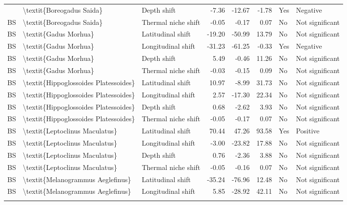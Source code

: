 \begin{longtable}[t]{lllrrrll}
{{\addlinespace
BS & \textbackslash{}textit\{Boreogadus Saida\} & Depth shift & -7.36 & -12.67 & -1.78 & Yes & Negative\\
BS & \textbackslash{}textit\{Boreogadus Saida\} & Thermal niche shift & -0.05 & -0.17 & 0.07 & No & Not significant\\
BS & \textbackslash{}textit\{Gadus Morhua\} & Latitudinal shift & -19.20 & -50.99 & 13.79 & No & Not significant\\
BS & \textbackslash{}textit\{Gadus Morhua\} & Longitudinal shift & -31.23 & -61.25 & -0.33 & Yes & Negative\\
BS & \textbackslash{}textit\{Gadus Morhua\} & Depth shift & 5.49 & -0.46 & 11.26 & No & Not significant\\
\addlinespace
BS & \textbackslash{}textit\{Gadus Morhua\} & Thermal niche shift & -0.03 & -0.15 & 0.09 & No & Not significant\\
BS & \textbackslash{}textit\{Hippoglossoides Platessoides\} & Latitudinal shift & 10.97 & -8.99 & 31.73 & No & Not significant\\
BS & \textbackslash{}textit\{Hippoglossoides Platessoides\} & Longitudinal shift & 2.57 & -17.30 & 22.34 & No & Not significant\\
BS & \textbackslash{}textit\{Hippoglossoides Platessoides\} & Depth shift & 0.68 & -2.62 & 3.93 & No & Not significant\\
BS & \textbackslash{}textit\{Hippoglossoides Platessoides\} & Thermal niche shift & -0.05 & -0.17 & 0.07 & No & Not significant\\
\addlinespace
BS & \textbackslash{}textit\{Leptoclinus Maculatus\} & Latitudinal shift & 70.44 & 47.26 & 93.58 & Yes & Positive\\
BS & \textbackslash{}textit\{Leptoclinus Maculatus\} & Longitudinal shift & -3.00 & -23.82 & 17.88 & No & Not significant\\
BS & \textbackslash{}textit\{Leptoclinus Maculatus\} & Depth shift & 0.76 & -2.36 & 3.88 & No & Not significant\\
BS & \textbackslash{}textit\{Leptoclinus Maculatus\} & Thermal niche shift & -0.05 & -0.16 & 0.07 & No & Not significant\\
BS & \textbackslash{}textit\{Melanogrammus Aeglefinus\} & Latitudinal shift & -35.24 & -76.96 & 12.48 & No & Not significant\\
\addlinespace
BS & \textbackslash{}textit\{Melanogrammus Aeglefinus\} & Longitudinal shift & 5.85 & -28.92 & 42.11 & No & Not significant\\
}}
\end{longtable}
